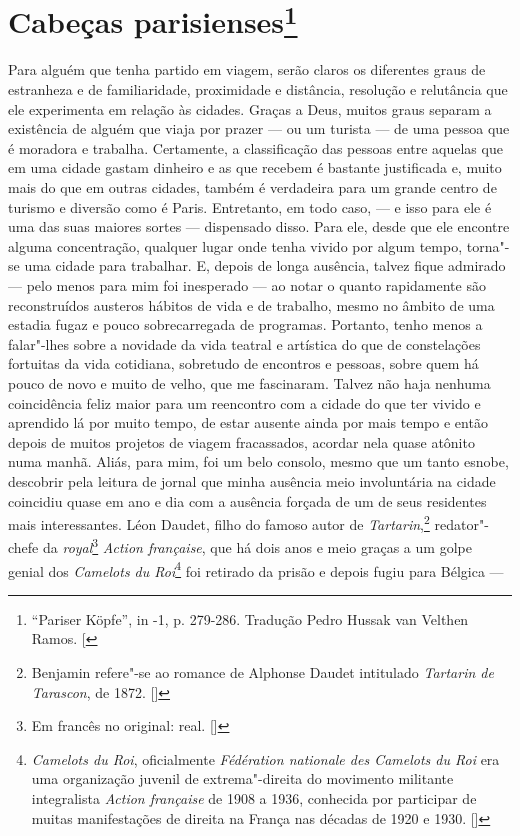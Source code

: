 \chapter{Cabeças parisienses\footnote[*]{``Pariser Köpfe'', in -1, p.
  279-286. Tradução Pedro Hussak van Velthen Ramos. {[}\versal{N.~E.}{]}}}

Para alguém que tenha partido em viagem, serão claros os diferentes
graus de estranheza e de familiaridade, proximidade e distância,
resolução e relutância que ele experimenta em relação às cidades. Graças
a Deus, muitos graus separam a existência de alguém que viaja por prazer
--- ou um turista --- de uma pessoa que é moradora e trabalha. Certamente, a
classificação das pessoas entre aquelas que em uma cidade gastam
dinheiro e as que recebem é bastante justificada e, muito mais do que em outras cidades, também é verdadeira para um grande centro de turismo e
diversão como é Paris. Entretanto, em todo caso, --- e isso para ele é uma das suas maiores sortes --- dispensado disso. Para ele, desde que ele encontre alguma concentração, qualquer lugar
onde tenha vivido por algum tempo, torna"-se uma cidade para
trabalhar. E, depois de longa ausência, talvez fique admirado --- pelo menos para mim foi inesperado --- ao notar o quanto rapidamente são reconstruídos austeros hábitos de vida e de trabalho, mesmo no âmbito de uma estadia fugaz e pouco sobrecarregada de programas. Portanto, tenho menos a falar"-lhes sobre a novidade da vida teatral e artística do que de constelações fortuitas da vida cotidiana, sobretudo de encontros e pessoas, sobre quem há pouco de novo e muito de velho, que me fascinaram.
Talvez não haja nenhuma coincidência feliz maior para um reencontro com
a cidade do que ter vivido e aprendido lá por muito tempo, de estar
ausente ainda por mais tempo e então depois de muitos projetos de viagem
fracassados, acordar nela quase atônito numa manhã. Aliás, para mim, foi
um belo consolo, mesmo que um tanto esnobe, descobrir pela leitura de
jornal que minha ausência meio involuntária na cidade coincidiu quase em
ano e dia com a ausência forçada de um de seus residentes mais
interessantes. Léon Daudet, filho do famoso autor de
\emph{Tartarin},\footnote{Benjamin refere"-se ao romance de Alphonse
  Daudet intitulado \emph{Tartarin de Tarascon}, de 1872. []} redator"-chefe
da \emph{royal}\footnote{Em francês no original: real. []} \emph{Action française}, que há dois anos e meio graças a um golpe genial dos
\emph{Camelots du Roi}\footnote{\emph{Camelots du Roi},
  oficialmente \emph{Fédération nationale des Camelots du Roi} era uma
  organização juvenil de extrema"-direita do movimento militante
  integralista \emph{Action française} de 1908 a 1936, conhecida por
  participar de muitas manifestações de direita na França nas décadas de
  1920 e 1930. []} foi retirado da prisão e depois fugiu para Bélgica ---
